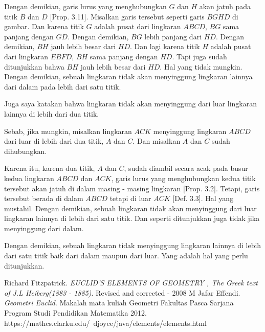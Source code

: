 \documentclass[a4paper]{book}
\begin{document}
Dengan demikian, garis lurus yang menghubungkan $G$ dan $H$ akan jatuh 
pada titik $B$ dan $D$ [Prop. 3.11]. Misalkan garis tersebut seperti
garis $BGHD$ di gambar. Dan karena titik $G$ adalah pusat dari lingkaran
$ABCD$, $BG$ sama panjang dengan $GD$. Dengan demikian, $BG$ lebih
panjang dari $HD$. Dengan demikian, $BH$ jauh lebih besar dari $HD$.
Dan lagi karena titik $H$ adalah pusat dari lingkaran $EBFD$, $BH$
sama panjang dengan $HD$. Tapi juga sudah ditunjukkan bahwa $BH$ jauh
lebih besar dari $HD$. Hal yang tidak mungkin. Dengan demikian, 
sebuah lingkaran tidak akan menyinggung lingkaran lainnya dari dalam
pada lebih dari satu titik.

Juga saya katakan bahwa lingkaran tidak akan menyinggung dari luar 
lingkaran lainnya di lebih dari dua titik.

Sebab, jika mungkin, misalkan lingkaran $ACK$ menyinggung lingkaran
$ABCD$ dari luar di lebih dari dua titik, $A$ dan $C$. Dan misalkan
$A$ dan $C$ sudah dihubungkan.

Karena itu, karena dua titik, $A$ dan $C$, sudah diambil secara acak
pada busur kedua lingkaran $ABCD$ dan $ACK$, garis lurus yang 
menghubungkan kedua titik tersebut akan jatuh di dalam masing - masing
lingkaran [Prop. 3.2]. Tetapi, garis tersebut berada di dalam $ABCD$ 
tetapi di luar $ACK$ [Def. 3.3]. Hal yang mustahil. Dengan demikian,
sebuah lingkaran tidak akan menyinggung dari luar lingkaran lainnya 
di lebih dari satu titik. Dan seperti ditunjukkan juga tidak jika
menyinggung dari dalam.

Dengan demikian, sebuah lingkaran tidak menyinggung lingkaran lainnya
di lebih dari satu titik baik dari dalam maupun dari luar. Yang adalah
hal yang perlu ditunjukkan.

\begin{thebibliography}{9}
Richard Fitzpatrick.
\textit{EUCLID’S ELEMENTS OF GEOMETRY , The Greek text of J.L Heiberg(1883 - 1885)}.
Revised and corrected - 2008 
M Jafar Effendi.
\textit{Geometri Euclid}.
Makalah mata kuliah Geometri Fakultas Pasca Sarjana Program Studi Pendidikan Matematika 2012.
https://mathcs.clarku.edu/~djoyce/java/elements/elements.html 
\end{thebibliography}
\end{document}
